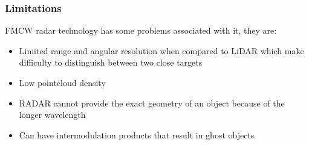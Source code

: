 \subsubsection{Limitations}
\ac{FMCW} {radar} technology has some problems associated with it, they are:
\begin{itemize}
\item{Limited range and angular resolution when compared to \ac{LiDAR} which make difficulty to distinguish between two close targets}  
\item{Low pointcloud density}  
\item{RADAR cannot provide the exact geometry of an object because of the longer wavelength}  
\item{Can have intermodulation products that result in ghost objects} 
\end{itemize}






